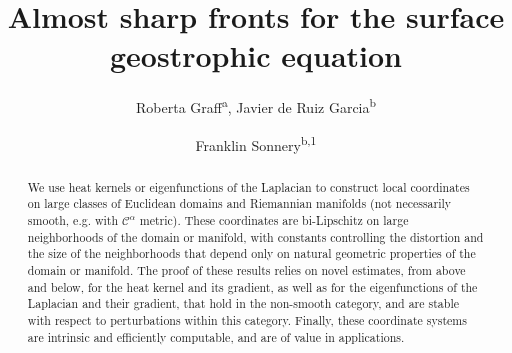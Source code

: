 \documentclass{pnas}
\begin{document}
\title{Almost sharp fronts for the surface geostrophic equation}

\author{Roberta Graff\textsuperscript{a}, Javier de Ruiz Garcia\textsuperscript{b} \and Franklin Sonnery\textsuperscript{b,1}}


\maketitle



\begin{abstract}
We use heat kernels or eigenfunctions of the Laplacian to construct local coordinates on large classes of Euclidean domains and Riemannian manifolds (not necessarily smooth, e.g. with \( \mathcal{C}^\alpha \) metric).
These coordinates are bi-Lipschitz on large neighborhoods of the domain or manifold, with  constants controlling the distortion and the size of the neighborhoods that depend only on natural geometric properties of the domain or manifold.
The proof of these results relies on novel estimates, from above and below, for the heat kernel and its gradient, as well as for the eigenfunctions of the Laplacian and their gradient, that hold in the non-smooth category, and are stable with respect to perturbations within this category.
Finally, these coordinate systems are intrinsic and efficiently computable, and are of value in applications.
\end{abstract}
\end{document}
